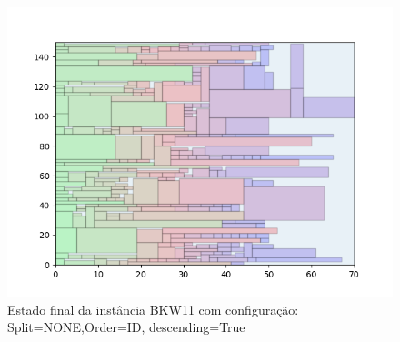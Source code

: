 \begin{figure}[H]
    \centering
    \caption[]{Estado final da instância BKW11 com configuração: Split=NONE,Order=ID, descending=True}
    \label{fig:bkw11-none-id-true}
    \includegraphics[scale=0.5]{output/figures/bkw/bkw11/none/id/true/000}
\end{figure}